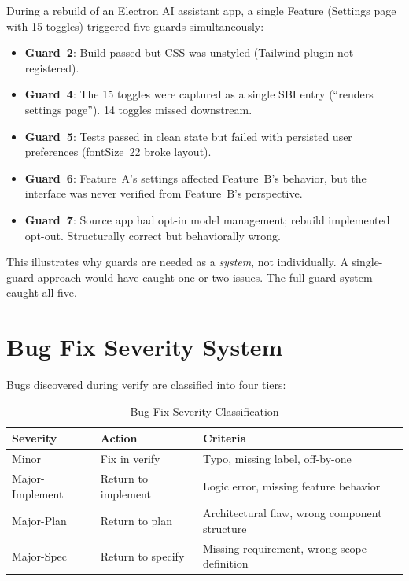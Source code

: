 \documentclass[11pt,a4paper,openright,twoside]{report}
\begin{document}
During a rebuild of an Electron AI assistant app, a single Feature (Settings page with 15 toggles) triggered five guards simultaneously:

\begin{itemize}
  \item \textbf{Guard~2}: Build passed but CSS was unstyled (Tailwind plugin not registered).
  \item \textbf{Guard~4}: The 15 toggles were captured as a single SBI entry (``renders settings page''). 14 toggles missed downstream.
  \item \textbf{Guard~5}: Tests passed in clean state but failed with persisted user preferences (fontSize~22 broke layout).
  \item \textbf{Guard~6}: Feature~A's settings affected Feature~B's behavior, but the interface was never verified from Feature~B's perspective.
  \item \textbf{Guard~7}: Source app had opt-in model management; rebuild implemented opt-out. Structurally correct but behaviorally wrong.
\end{itemize}

This illustrates why guards are needed as a \emph{system}, not individually. A single-guard approach would have caught one or two issues. The full guard system caught all five.

\section{Bug Fix Severity System}

Bugs discovered during verify are classified into four tiers:

\begin{table}[H]
\centering
\caption{Bug Fix Severity Classification}
\label{tab:severity}
\begin{tabularx}{\textwidth}{llX}
\toprule
\textbf{Severity} & \textbf{Action} & \textbf{Criteria} \\
\midrule
Minor & Fix in verify & Typo, missing label, off-by-one \\
Major-Implement & Return to implement & Logic error, missing feature behavior \\
Major-Plan & Return to plan & Architectural flaw, wrong component structure \\
Major-Spec & Return to specify & Missing requirement, wrong scope definition \\
\bottomrule
\end{tabularx}
\end{table}
\end{document}
